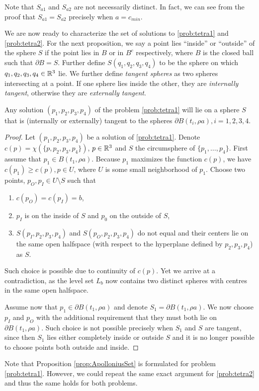 Note that $S_{a1}$ and $S_{a2}$ are not necessarily distinct. In fact, we can see from the proof that $S_{a1}=S_{a2}$ precisely when $a=c_{min}$.


We are now ready to characterize the set of solutions to \ref{prob:tetra1} and \ref{prob:tetra2}. For the next proposition, we say a point lies ``inside'' or ``outside'' of the sphere $S$ if the point lies in $B$ or in $B^c$ respectively, where $B$ is the closed ball such that $\partial B = S$. Further define $S(q_1,q_2,q_3,q_4)$ to be the sphere on which $q_1,q_2,q_3,q_4\in{\mathbb R^3}$ lie. We further define \textit{tangent spheres} as two spheres intersecting at a point. If one sphere lies inside the other, they are \textit{internally tangent}, otherwise they are \textit{externally tangent}. 


\begin{proposition}\label{prop:ApolloniusSet}
Any solution $(p_1,p_2,p_3,p_4)$ of the problem \ref{prob:tetra1} will lie on a sphere $S$ that is (internally or externally) tangent to the spheres $\partial B(t_i,\rho a), i =1,2,3,4$. 
\end{proposition}
\begin{proof}
	Let $(p_1,p_2,p_3,p_4)$ be a solution of \ref{prob:tetra1}. Denote $c(p)=\chi(\{p,p_2,p_3,p_4\})$, $ p \in {\mathbb R^3}$ and $S$ the circumsphere of $\{p_1,\dots,p_4\}$. 
	First assume that $p_1 \in B(t_1,\rho a)$. Because $p_1$ maximizes the function $c(p)$, we have $c(p_1)\geq c(p), p\in U$, where $U$ is some small neighborhood of $p_1$. Choose two points, $p_O,p_I\in U\setminus S$ such that 
\begin{enumerate} 
\item $c(p_O)=c(p_I)=b$,
\item $p_I$ is on the inside of $S$ and $p_0$ on the outside of $S$,
\item $S(p_I,p_2,p_3,p_4)$ and $S(p_O,p_2,p_3,p_4)$ do not equal and their centers lie on the same open halfspace (with respect to the hyperplane defined by $p_2,p_3,p_4$) as $S$. 
\end{enumerate}
Such choice is possible due to continuity of $c(p)$. Yet we arrive at a contradiction, as the level set $L_b$ now contains two distinct spheres with centres in the same open halfspace. 

Assume now that $p_1 \in \partial B(t_1,\rho a)$ and denote $S_1=\partial B(t_1,\rho a)$. We now choose $p_I$ and $p_O$ with the additional requirement that they must both lie on $\partial B(t_1,\rho a)$. Such choice is not possible precisely when $S_1$ and $S$ are tangent, since then  $S_1$ lies either completely inside or outside $S$ and it is no longer possible to choose points both outside and inside. 
\end{proof}
Note that Proposition \ref{prop:ApolloniusSet} is formulated for problem \ref{prob:tetra1}. However, we could repeat the same exact argument for \ref{prob:tetra2} and thus the same holds for both problems.\newline

